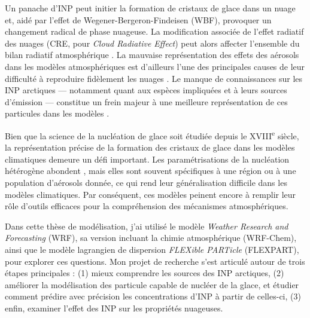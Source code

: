Un panache d’INP peut initier la formation de cristaux de glace dans un nuage et, aidé par l’effet de Wegener-Bergeron-Findeisen (WBF), provoquer un changement radical de phase nuageuse.  
La modification associée de l’effet radiatif des nuages (CRE, pour \textit{Cloud Radiative Effect}) peut alors affecter l’ensemble du bilan radiatif atmosphérique \citep{storelvmo_aerosol_2008}.  
La mauvaise représentation des effets des aérosols dans les modèles atmosphériques est d’ailleurs l’une des principales causes de leur difficulté à reproduire fidèlement les nuages \citep{bony_clouds_2015}.  
Le manque de connaissances sur les INP arctiques --- notamment quant aux espèces impliquées et à leurs sources d’émission --- constitue un frein majeur à une meilleure représentation de ces particules dans les modèles \citep{murray_opinion_2021}.

Bien que la science de la nucléation de glace soit étudiée depuis le XVIII\textsuperscript{e} siècle, la représentation précise de la formation des cristaux de glace dans les modèles climatiques demeure un défi important.  
Les paramétrisations de la nucléation hétérogène abondent \citep[e.g.][]{fletcher_active_1969,cooper_ice_1986, demott_predicting_2010, li_predicting_2022}, mais elles sont souvent spécifiques à une région ou à une population d’aérosols donnée, ce qui rend leur généralisation difficile dans les modèles climatiques.  
Par conséquent, ces modèles peinent encore à remplir leur rôle d’outils efficaces pour la compréhension des mécanismes atmosphériques.

Dans cette thèse de modélisation, j’ai utilisé le modèle \textit{Weather Research and Forecasting} (WRF), sa version incluant la chimie atmosphérique (WRF-Chem), ainsi que le modèle lagrangien de dispersion \textit{FLEXible PARTicle} (FLEXPART), pour explorer ces questions.  
Mon projet de recherche s’est articulé autour de trois étapes principales :  
(1) mieux comprendre les sources des INP arctiques,  
(2) améliorer la modélisation des particule capable de nucléer de la glace, et étudier comment prédire avec précision les concentrations d’INP à partir de celles-ci,  
(3) enfin, examiner l’effet des INP sur les propriétés nuageuses.


